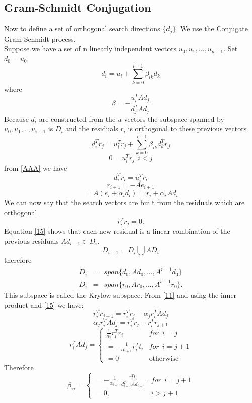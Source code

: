 \subsection{Gram-Schmidt Conjugation}
Now to define a set of orthogonal search directions $ \{d_j\}$. We use the
Conjugate Gram-Schmidt process.\\
Suppose we have a set of n linearly independent vectors $u_0,u_1,...,u_{n-1}$.
Set $d_0=u_0$,
\[d_i = u_i + \sum_{k=0}^{i-1}\beta_{ik}d_k \]
where
\begin{equation}
\label{11}
\beta = - \frac{u^{T}_iAd_j}{d^T_jAd_j}
\end{equation}
Because $d_i$ are constructed from the $u$ vectors the subspace spanned by
$u_0,u_1,..,u_{i-1}$ is $D_i$ and the residuals $r_i$ is orthogonal to these 
previous vectors
\begin{equation}
\label{AAA}
d_i^Tr_j = u_i^Tr_j+\sum_{k=0}^{i-1}\beta_{ik}d_{k}^Tr_j 
\end{equation}
\begin{equation}
0=u_i^Tr_j \ \ i<j
\end{equation}
from \ref{AAA} we have 
\begin{equation}
d_i^T r_i=u^T_ir_i
\end{equation}
\[r_{i+1} = - Ae_{i+1} \]
\begin{equation}
\label{15}
=A(e_i+\alpha_id_i ) = r_i+\alpha_iAd_i \end{equation}
We can now say that the search vectors are built from the residuals which are orthogonal
\[r_i^Tr_j=0. \]
Equation \ref{15} shows that each new residual is a linear combination of the previous residuals $Ad_{i-1}\in D_i$.
\[ D_{i+1}=D_i \bigcup AD_i \] 
therefore
\begin{eqnarray*}
D_i &=& span\{d_0,Ad_0,...,A^{i-1}d_0 \}\\
D_i &=& span\{r_0,Ar_0,...,A^{i-1}r_0 \}.
\end{eqnarray*}
This subspace is called the Krylow subspace.  From \ref{11} and using the inner product and \ref{15} we have:
\[r_i^Tr_{j+1}=r_i^Tr_j-\alpha_j r_i^TAd_j \]
\[
\alpha_j r_i^TAd_j = r_i^Tr_j- r_i^Tr_{j+1}\]
\[
r_i^TAd_j =\left\{ \begin{array}{ll}  \frac{1}{\alpha_i}r_i^Tr_i & for \ \ i=j\\
= -\frac{1}{\alpha_{i+1}}r_i^Tt_i & for \ \ i=j+1 \\
= 0 &\mbox{otherwise} \end{array} \right.
\]
Therefore
\[
\beta_{ij} =\left\{ \begin{array}{ll}  
= -\frac{1}{\alpha_{i+1}}\frac{r_i^Tt_i}{d^T_{i-1}Ad_{i-1}} & for \ \ i=j+1\\
= 0, & i>j+1 \end{array} \right.
\]
